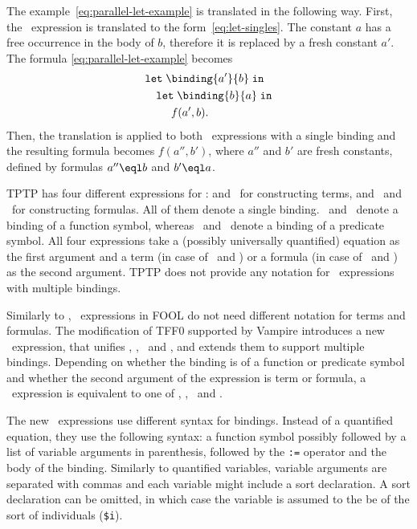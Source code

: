 The example~\eqref{eq:parallel-let-example} is translated in the following way. First, the \LETIN\ expression is translated to the form~\eqref{eq:let-singles}. The constant $a$ has a free occurrence in the body of $b$, therefore it is replaced by a fresh constant $a'$. The formula \eqref{eq:parallel-let-example} becomes
\begin{equation*}
\begin{aligned}
  &\mathtt{let}\;\binding{a'}{b}\;\mathtt{in}\\
  &\quad\mathtt{let}\;\binding{b}{a}\;\mathtt{in}\\
  &\quad\quad\ f(a', b).
\end{aligned}
\end{equation*}
Then, the translation is applied to both \LETIN\ expressions with a single binding and the resulting formula becomes $f(a'', b')$, where $a''$ and $b'$ are fresh constants, defined by formulas $a'' \eql b$ and $b' \eql a$.

TPTP has four different expressions for \LETIN: \dlettt and \dletft\ for constructing terms, and \dlettf\  and \dletff\  for constructing formulas. All of them denote a single binding. \dlettt\ and \dlettf\ denote a binding of a function symbol, whereas \dletft\ and \dletff\ denote a binding of a predicate symbol. All four expressions take a (possibly universally quantified) equation as the first argument and a term (in case of \dlettt\ and \dletft) or a formula (in case of \dlettf\ and \dletff) as the second argument. TPTP does not provide any notation for \LETIN\  expressions with multiple bindings.

Similarly to \ITE, \LETIN\ expressions in FOOL do not need different notation for terms and formulas. The modification of TFF0 supported by Vampire introduces a new \dlet\ expression, that unifies \dlettt, \dletft, \dlettf\ and \dletff, and extends them to support multiple bindings. Depending on whether the binding is of a function or predicate symbol and whether the second argument of the expression is term or formula, a \dlet\ expression is equivalent to one of \dlettt, \dletft, \dlettf\ and \dletff.

The new \dlet\ expressions use different syntax for bindings. Instead of a quantified equation, they use the following syntax: a function symbol possibly followed by a list of variable arguments in parenthesis, followed by the \lstinline':=' operator and the body of the binding. Similarly to quantified variables, variable arguments are separated with commas and each variable might include a sort declaration. A sort declaration can be omitted, in which case the variable is assumed to the be of the sort of individuals (\verb|$i|).

